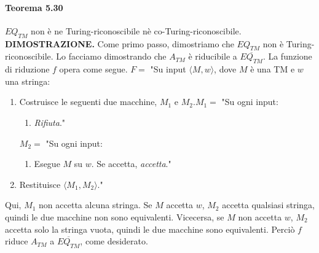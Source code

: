 \documentclass{article}
\begin{document}
\paragraph{Teorema 5.30}
\label{teorema-5.30}
\text{}
\newline
$EQ_{TM}$ non è ne Turing-riconoscibile nè co-Turing-riconoscibile.
\vspace{1em}
\text{}
\newline
\hbox{\textbf{DIMOSTRAZIONE.}}
Come primo passo, dimostriamo che $EQ_{TM}$ non è Turing-riconoscibile.
Lo facciamo dimostrando che $A_{TM}$ è riducibile a $\overline{EQ_{TM}}$.
La funzione di riduzione $f$ opera come segue.
\vspace{1em}
\text{}
\newline
$F =$ "Su input $\langle M,w \rangle$, dove $M$ è una TM e $w$ una stringa:
\begin{enumerate}
    \item Costruisce le seguenti due macchine, $M_1$ e $M_2$.\newline $M_1 =$ "Su ogni input: \begin{enumerate}
        \item \textit{Rifiuta}." \end{enumerate}$M_2 =$ "Su ogni input: \begin{enumerate}
        \item Esegue $M$ su $w$. Se accetta, \textit{accetta}." \end{enumerate}
    \item Restituisce $\langle M_1,M_2 \rangle$."
\end{enumerate}
Qui, $M_1$ non accetta alcuna stringa.
Se $M$ accetta $w$, $M_2$ accetta qualsiasi stringa, quindi le due macchine non sono equivalenti.
Vicecersa, se $M$ non accetta $w$, $M_2$ accetta solo la stringa vuota, quindi le due macchine sono equivalenti.
Perciò $f$ riduce $A_{TM}$ a $\overline{EQ_{TM}}$, come desiderato.
\end{document}
